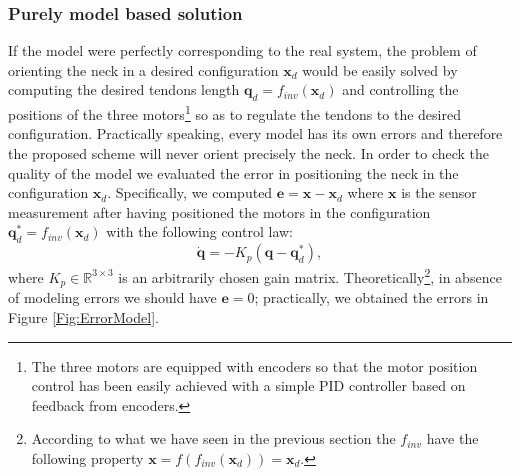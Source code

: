 \documentclass[conference]{IEEEtran}
\numberwithin{equation}{section}
\newcommand{\q}{\mathbf{q}}
\newcommand{\x}{\mathbf{x}}
\begin{document}
\subsubsection{Purely model based solution} \label{Sec:ModelBasedSolution}

If the model were perfectly corresponding to the real system, the problem of orienting the neck in a desired configuration $\x_d$ would be easily solved by computing the desired tendons length $\q_d = f_{inv} (\x_d)$ and controlling the positions of the three motors\footnote{The three motors are equipped with encoders so that the motor position control has been easily achieved with a simple PID controller based on feedback from encoders.} so as to regulate the tendons to the desired configuration. Practically speaking, every model has its own errors and therefore the proposed scheme will never orient precisely the neck. In order to check the quality of the model we evaluated the error in positioning the neck in the configuration $\x_d$. Specifically, we computed $\mathbf e = \x - \x_d$ where $\x$ is the sensor measurement after having positioned the motors in the configuration $\q^*_d = f_{inv}(\x_d)$ with the following control law:
\begin{equation} \label{Eq:PurelyModelBasedControl}
\dot{\q} = - K_p (\q - \q^*_d),
\end{equation}
where $K_p \in \mathbb R^{3 \times 3}$ is an arbitrarily chosen gain matrix. Theoretically\footnote{According to what we have seen in the previous section the $f_{inv}$ have the following property $\x = f(f_{inv} (\x_d)) = \x_d$.}, in absence of modeling errors we should have $\mathbf e = 0$; practically, we obtained the errors in Figure \ref{Fig:ErrorModel}.
\end{document}
